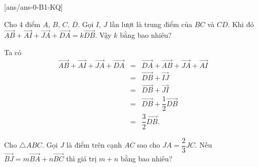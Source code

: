 [ans/ans-0-B1-KQ]
\caukq
\begin{ex}%
	Cho $4$ điểm $A$, $B$, $C$, $D$. Gọi $I$, $J$ lần lượt là trung điểm của $B C$ và $C D$. Khi đó $\overrightarrow{AB}+\overrightarrow{A I}+\overrightarrow{J A}+\overrightarrow{D A}=k \overrightarrow{D B}$. Vậy $k$ bằng bao nhiêu?\par
	\loigiai
	{
		Ta có 
		\begin{eqnarray*}
			\overrightarrow{AB}+\overrightarrow{A I}+\overrightarrow{J A}+\overrightarrow{D A}&=&\overrightarrow{D A}+\overrightarrow{AB}+\overrightarrow{J A}+\overrightarrow{A I} \\
			&= & \overrightarrow{D B}+\overrightarrow{I J}\\
			&= & \overrightarrow{D B}+\overrightarrow{J I}\\
			&=& \overrightarrow{D B}+\dfrac{1}{2} \overrightarrow{D B}\\
			&=& \dfrac{3}{2} \overrightarrow{D B}.
		\end{eqnarray*}
	}
\end{ex}
\begin{ex}%
	Cho $\triangle A B C$. Gọi $J$ là điểm trên cạnh $A C$ sao cho $J A=\dfrac{2}{3} J C$. Nếu $\overrightarrow{BJ}=m\overrightarrow{BA}+n\overrightarrow{B C}$ thì giá trị $m+n$ bằng bao nhiêu?
\end{ex}

